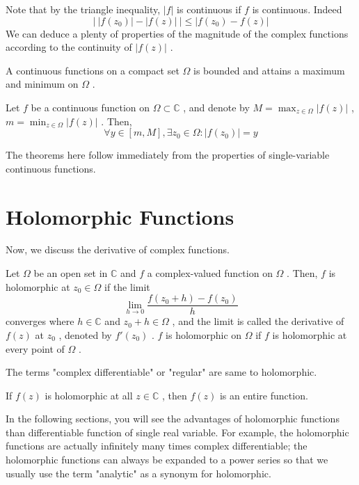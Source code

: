 \documentclass[12pt]{report}
\theoremstyle{mydefstyle}
\newcommand{\CC}{\mathbb{C}}
\begin{document}
Note that by the triangle inequality, $|f|$ is continuous if $f$ is continuous. Indeed
\[ \left|\ |f(z_0)|-|f(z)|\ \right|\leqslant |f(z_0)-f(z)| \]
We can deduce a plenty of properties of the magnitude of the complex functions according to the continuity of $|f(z)|$ .

\begin{theorem}
\label{the:extreme of continuous functions}
    A continuous functions on a compact set $\Omega$ is bounded and attains a maximum and minimum on $\Omega$ .
\end{theorem}

\begin{theorem}
\label{the:mean value property}
    Let $f$ be a continuous function on $\Omega \subset \CC$ , and denote by $M=\max_{z \in \Omega}|f(z)|$ , $m=\min_{z \in \Omega}|f(z)|$ . Then, 
    \[ \forall y \in [m,M] , \exists z_0 \in \Omega: |f(z_0)|=y \]
\end{theorem}

The theorems here follow immediately from the properties of single-variable continuous functions.

\section{Holomorphic Functions}

Now, we discuss the derivative of complex functions.

\begin{definition}
\label{def:holomorphi functions}
    Let $\Omega$ be an open set in $\CC$ and $f$ a complex-valued function on $\Omega$ . Then, $f$ is holomorphic at $z_0 \in \Omega$ if the limit
    \[ \lim_{h\to 0}\frac{f(z_0+h)-f(z_0)}{h} \]
    converges where $h \in \CC$ and $z_0+h \in \Omega$ , and the limit is called the derivative of $f(z)$ at $z_0$ , denoted by $f'(z_0)$ . $f$ is holomorphic on $\Omega$ if $f$ is holomorphic at every point of $\Omega$ .
\end{definition}

The terms "complex differentiable" or "regular" are same to holomorphic. 

\begin{definition}
\label{def:entire functions}  
    If $f(z)$ is holomorphic at all $z \in \CC$ , then $f(z)$ is an entire function.
\end{definition}

In the following sections, you will see the advantages of holomorphic functions than differentiable function of single real variable. For example, the holomorphic functions are actually infinitely many times complex differentiable; the holomorphic functions can always be expanded to a power series so that we usually use the term "analytic" as a synonym for holomorphic.
\end{document}
